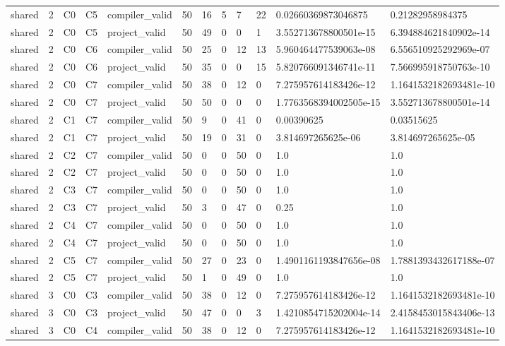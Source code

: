 \begin{tabular}{llllllllllll}
shared & 2 & C0 & C5 & compiler\_valid & 50 & 16 & 5 & 7 & 22 & 0.02660369873046875 & 0.21282958984375 \\
shared & 2 & C0 & C5 & project\_valid & 50 & 49 & 0 & 0 & 1 & 3.552713678800501e-15 & 6.394884621840902e-14 \\
shared & 2 & C0 & C6 & compiler\_valid & 50 & 25 & 0 & 12 & 13 & 5.960464477539063e-08 & 6.556510925292969e-07 \\
shared & 2 & C0 & C6 & project\_valid & 50 & 35 & 0 & 0 & 15 & 5.820766091346741e-11 & 7.566995918750763e-10 \\
shared & 2 & C0 & C7 & compiler\_valid & 50 & 38 & 0 & 12 & 0 & 7.275957614183426e-12 & 1.1641532182693481e-10 \\
shared & 2 & C0 & C7 & project\_valid & 50 & 50 & 0 & 0 & 0 & 1.7763568394002505e-15 & 3.552713678800501e-14 \\
shared & 2 & C1 & C7 & compiler\_valid & 50 & 9 & 0 & 41 & 0 & 0.00390625 & 0.03515625 \\
shared & 2 & C1 & C7 & project\_valid & 50 & 19 & 0 & 31 & 0 & 3.814697265625e-06 & 3.814697265625e-05 \\
shared & 2 & C2 & C7 & compiler\_valid & 50 & 0 & 0 & 50 & 0 & 1.0 & 1.0 \\
shared & 2 & C2 & C7 & project\_valid & 50 & 0 & 0 & 50 & 0 & 1.0 & 1.0 \\
shared & 2 & C3 & C7 & compiler\_valid & 50 & 0 & 0 & 50 & 0 & 1.0 & 1.0 \\
shared & 2 & C3 & C7 & project\_valid & 50 & 3 & 0 & 47 & 0 & 0.25 & 1.0 \\
shared & 2 & C4 & C7 & compiler\_valid & 50 & 0 & 0 & 50 & 0 & 1.0 & 1.0 \\
shared & 2 & C4 & C7 & project\_valid & 50 & 0 & 0 & 50 & 0 & 1.0 & 1.0 \\
shared & 2 & C5 & C7 & compiler\_valid & 50 & 27 & 0 & 23 & 0 & 1.4901161193847656e-08 & 1.7881393432617188e-07 \\
shared & 2 & C5 & C7 & project\_valid & 50 & 1 & 0 & 49 & 0 & 1.0 & 1.0 \\
shared & 3 & C0 & C3 & compiler\_valid & 50 & 38 & 0 & 12 & 0 & 7.275957614183426e-12 & 1.1641532182693481e-10 \\
shared & 3 & C0 & C3 & project\_valid & 50 & 47 & 0 & 0 & 3 & 1.4210854715202004e-14 & 2.4158453015843406e-13 \\
shared & 3 & C0 & C4 & compiler\_valid & 50 & 38 & 0 & 12 & 0 & 7.275957614183426e-12 & 1.1641532182693481e-10 \\

\end{tabular}
